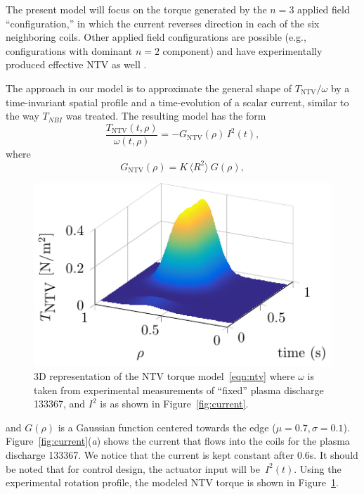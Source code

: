 \documentclass{iopart}
\begin{document}
The present model  will focus on the torque generated by the $n=3$ applied field ``configuration,'' in which the current reverses direction in each of the six neighboring coils. Other applied field configurations are possible (e.g., configurations with dominant $n = 2$ component) and have experimentally produced effective NTV as well \cite{Sabbagh10}.
 
The approach in our model is to approximate the general shape of $T_\text{NTV}/\omega$ by a time-invariant spatial profile and a time-evolution of a scalar current, similar to the way $T_{NBI}$ was treated. The resulting model has the form  
\begin{equation}
   \frac{T_\text{NTV}(t,\rho)}{\omega(t,\rho)} = - G_\text{NTV}  (\rho) \, I^2(t),
\end{equation}
where
\begin{equation}
G_\text{NTV}  (\rho) = K \,  \langle R^2 \rangle \:G(\rho),
\end{equation}
%
\begin{figure}
\centering
\includegraphics{imene_figs/fig7} %
\caption{3D representation of the NTV torque model~\eqref{eqn:ntv} where
  $\omega$ is taken from experimental measurements of ``fixed'' plasma discharge
  133367, and $I^2$ is as shown in Figure~\ref{fig:current}.}
\label{TNTV3D}
\end{figure}
%
and $G(\rho)$ is a Gaussian function centered towards the edge ($\mu =0.7, \sigma =0.1$).
%
Figure~{\ref{fig:current}}(\emph{a}) shows the current that flows into the coils
for the plasma discharge 133367. We notice that the current is kept constant
after $0.6$s. It should be noted that for control design, the actuator input
will be~$I^2(t)$.
%
Using the experimental rotation profile, the modeled NTV torque is shown in Figure~\ref{TNTV3D}.
\end{document}
